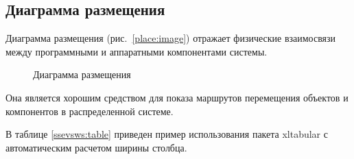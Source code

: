 %
%
%
%
%

\subsection{Диаграмма размещения}

Диаграмма размещения (рис.~\ref{place:image}) отражает физические взаимосвязи между программными и аппаратными компонентами системы.

\begin{figure}[ht]
\caption{Диаграмма размещения}
\label{client-server.eps:image}
\end{figure}

Она является хорошим средством для показа маршрутов перемещения объектов и компонентов в распределенной системе.

В таблице \ref{ssevsws:table} приведен пример использования пакета xltabular с автоматическим расчетом ширины столбца.


